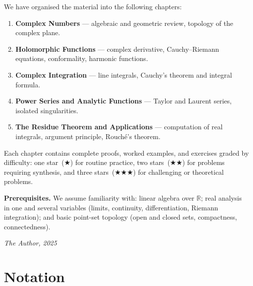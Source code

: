 \documentclass[12pt,a4paper,openany]{book}
\theoremstyle{definition}
\theoremstyle{plain}
\theoremstyle{remark}
\newcommand{\R}{\mathbb{R}}
\begin{document}
We have organised the material into the following chapters:
\begin{enumerate}
  \item \textbf{Complex Numbers} --- algebraic and geometric review, topology of the complex plane.
  \item \textbf{Holomorphic Functions} --- complex derivative, Cauchy--Riemann equations, conformality, harmonic functions.
  \item \textbf{Complex Integration} --- line integrals, Cauchy's theorem and integral formula.
  \item \textbf{Power Series and Analytic Functions} --- Taylor and Laurent series, isolated singularities.
  \item \textbf{The Residue Theorem and Applications} --- computation of real integrals, argument principle, Rouch\'e's theorem.
\end{enumerate}

Each chapter contains complete proofs, worked examples, and exercises graded by difficulty: one star~($\bigstar$) for routine practice, two stars~($\bigstar\!\bigstar$) for problems requiring synthesis, and three stars~($\bigstar\!\bigstar\!\bigstar$) for challenging or theoretical problems.

\medskip

\textbf{Prerequisites.} We assume familiarity with: linear algebra over $\R$; real analysis in one and several variables (limits, continuity, differentiation, Riemann integration); and basic point-set topology (open and closed sets, compactness, connectedness).

\vfill
\hfill\textit{The Author, 2025}

\chapter*{Notation}
\end{document}
